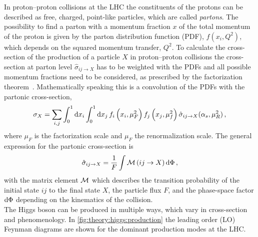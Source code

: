 In proton--proton collisions at the LHC the constituents of the protons can be described as free, charged, point-like particles, which are called \emph{partons}.
The possibility to find a parton with a momentum fraction $x$ of the total momentum of the proton is given
by the parton distribution function (PDF), $f(x_i, Q^2)$, which depends on the squared momentum transfer, $Q^2$.
To calculate the cross-section of the production of a particle $X$ in proton--proton collisions the
cross-section at parton level $\hat{\sigma}_{ij\to X}$ has to be weighted with the PDFs and all
possible momentum fractions need to be considered, as prescribed by the factorization theorem~\cite{DRELL1971578}.
Mathematically speaking this is a convolution of the PDFs with the partonic cross-section,
\begin{equation}
    \sigma_{X} = \sum_{i,j} \int_{0}^{1} \dif x_i \int_{0}^{1} \dif x_j \,
    f_i \left( x_i , \mu_F^2 \right) f_j \left( x_j , \mu_f^2 \right) \hat{\sigma}_{ij\to X} (\alpha_s, \mu_R^2) \,,
\end{equation}
where $\mu_F$ is the factorization scale and $\mu_F$ the renormalization scale.
The general expression for the partonic cross-section is~\cite{Griffiths}
\begin{equation}
    \hat{\sigma}_{ij\to X} = \frac{1}{F} \int \matrixm \left(ij \to X \right) \dif \Phi \,,
\end{equation}
with the matrix element $\mathcal{M}$ which describes the transition probability of the initial state $ij$ to the final state $X$, the
particle flux $F$, and the phase-space factor $\dif \Phi$ depending on the kinematics of the collision.
\\[\baselineskip]
The Higgs boson can be produced in multiple ways, which vary in cross-section and phenomenology.
In \cref{fig:theory:higgs:production} the leading order (LO) Feynman diagrams are shown for the dominant production modes
at the LHC\@.

